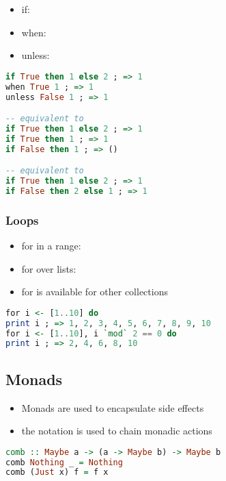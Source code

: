 \documentclass[a4paper,landscape,10pt]{article}
\begin{document}
\begin{multicols*}{2}
  \begin{itemize}
    \item if: 
    \item when: 
    \item unless: 
  \end{itemize}

  \begin{lstlisting}[language=Haskell]
if True then 1 else 2 ; => 1
when True 1 ; => 1
unless False 1 ; => 1

-- equivalent to
if True then 1 else 2 ; => 1
if True then 1 ; => 1
if False then 1 ; => ()

-- equivalent to
if True then 1 else 2 ; => 1
if False then 2 else 1 ; => 1
\end{lstlisting}

  \subsubsection{Loops}

  \begin{itemize}
    \item for in a range: 
    \item for over lists: 
    \item for is available for other collections
  \end{itemize}

  \begin{lstlisting}[language=Haskell]
for i <- [1..10] do
print i ; => 1, 2, 3, 4, 5, 6, 7, 8, 9, 10
for i <- [1..10], i `mod` 2 == 0 do
print i ; => 2, 4, 6, 8, 10
\end{lstlisting}

  \breakcolumn

  \subsection{Monads}

  \begin{itemize}
    \item Monads are used to encapsulate side effects
    \item the  notation is used to chain monadic actions
  \end{itemize}

  \begin{lstlisting}[language=Haskell]
comb :: Maybe a -> (a -> Maybe b) -> Maybe b
comb Nothing _ = Nothing
comb (Just x) f = f x
\end{lstlisting}


\end{multicols*}
\end{document}
